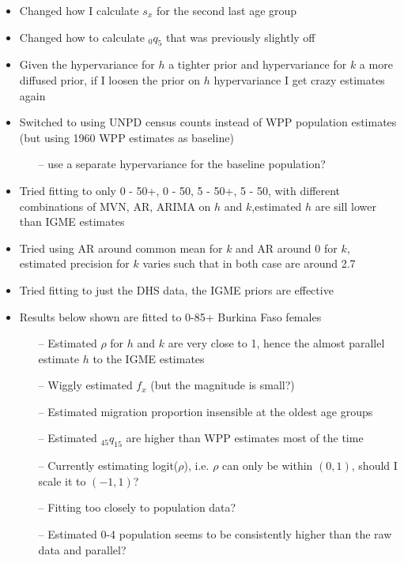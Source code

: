 \documentclass[12pt,a4paper]{article}
\date{\vspace{-5ex}}
\begin{document}
\begin{itemize}
\item Changed how I calculate $s_x$ for the second last age group
\item Changed how to calculate $_0q_5$ that was previously slightly off
\item Given the hypervariance for $h$ a tighter prior and hypervariance for	$k$ a more diffused prior, if I loosen the prior on $h$ hypervariance I get crazy estimates again
\item Switched to using UNPD census counts instead of WPP population estimates (but using 1960 WPP estimates as baseline)
 \begin{itemize}
 \item[--] use a separate hypervariance for the baseline population?
 \end{itemize}
\item Tried fitting to only 0 - 50+, 0 - 50, 5 - 50+, 5 - 50, with different combinations of MVN, AR, ARIMA on $h$ and $k$,estimated $h$ are sill lower than IGME estimates
\item Tried using AR around common mean for $k$ and AR around 0 for $k$, estimated precision for $k$ varies such that in both case are around 2.7
\item Tried fitting to just the DHS data, the IGME priors are effective
\item Results below shown are fitted to 0-85+ Burkina Faso females
\begin{itemize}
  \item[--] Estimated $\rho$ for $h$ and $k$ are very close to 1, hence the almost parallel estimate $h$ to the IGME estimates
  \item[--] Wiggly estimated $f_x$ (but the magnitude is small?)
	\item[--] Estimated migration proportion insensible at the oldest age groups
	\item[--] Estimated $_{45}q_{15}$ are higher than WPP estimates most of the time
  \item[--] Currently estimating logit($\rho$), i.e. $\rho$ can only be within $(0,1)$, should I scale it to $(-1,1)$?
	\item[--] Fitting too closely to population data?
	\item[--] Estimated 0-4 population seems to be consistently higher than the raw data and parallel?
\end{itemize}
\end{itemize}
\end{document}
